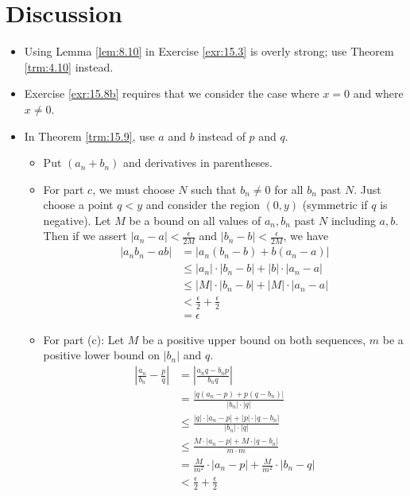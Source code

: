 \documentclass{report}
\begin{document}
\section{Discussion}
\begin{itemize}
    \item {}Using Lemma \ref{lem:8.10} in Exercise \ref{exr:15.3} is overly strong; use Theorem \ref{trm:4.10} instead.
    \item {}Exercise \ref{exr:15.8b} requires that we consider the case where $x=0$ and where $x\neq 0$.
    \item In Theorem \ref{trm:15.9}, use $a$ and $b$ instead of $p$ and $q$.
    \begin{itemize}
        \item Put $(a_n+b_n)$ and derivatives in parentheses.
        \item For part $c$, we must choose $N$ such that $b_n\neq 0$ for all $b_n$ past $N$. Just choose a point $q<y$ and consider the region $(0,y)$ (symmetric if $q$ is negative). Let $M$ be a bound on all values of $a_n,b_n$ past $N$ including $a,b$. Then if we assert $|a_n-a|<\frac{\epsilon}{2M}$ and $|b_n-b|<\frac{\epsilon}{2M}$, we have
        \begin{align*}
            |a_nb_n-ab| &= |a_n(b_n-b)+b(a_n-a)|\\
            &\leq |a_n|\cdot|b_n-b|+|b|\cdot|a_n-a|\\
            &\leq |M|\cdot|b_n-b|+|M|\cdot|a_n-a|\\
            &< \frac{\epsilon}{2}+\frac{\epsilon}{2}\\
            &= \epsilon
        \end{align*}
        \item For part (c): Let $M$ be a positive upper bound on both sequences, $m$ be a positive lower bound on $|b_n|$ and $q$.
        \begin{align*}
            \left| \frac{a_n}{b_n}-\frac{p}{q} \right| &= \left| \frac{a_nq-b_np}{b_nq} \right|\\
            &= \frac{|q(a_n-p)+p(q-b_n)|}{|b_n|\cdot|q|}\\
            &\leq \frac{|q|\cdot|a_n-p|+|p|\cdot|q-b_n|}{|b_n|\cdot|q|}\\
            &\leq \frac{M\cdot|a_n-p|+M\cdot|q-b_n|}{m\cdot m}\\
            &= \frac{M}{m^2}\cdot|a_n-p|+\frac{M}{m^2}\cdot|b_n-q|\\
            &< \frac{\epsilon}{2}+\frac{\epsilon}{2}\\

\end{align*}
\end{itemize}
\end{itemize}
\end{document}
